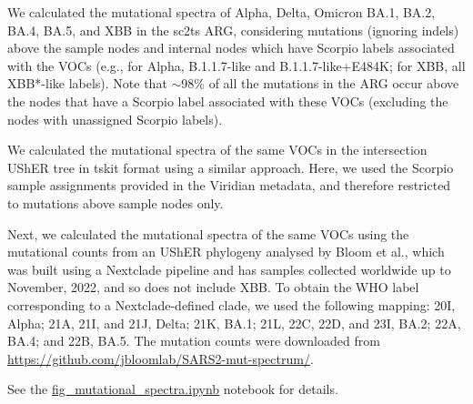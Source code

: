 \documentclass[12pt]{article}
\begin{document}
We calculated the mutational spectra of Alpha, Delta, Omicron BA.1, BA.2, BA.4, BA.5, and XBB
in the sc2ts ARG, considering mutations (ignoring indels) above the sample
nodes and internal nodes
which have Scorpio labels associated with the VOCs
(e.g., for Alpha, B.1.1.7-like and B.1.1.7-like+E484K;
for XBB, all XBB*-like labels).
Note that $\sim$98\% of all the mutations in the ARG occur
above the nodes that have a Scorpio label associated with these VOCs
(excluding the nodes with unassigned Scorpio labels).

We calculated the mutational spectra of the same VOCs
in the intersection UShER tree in tskit format using a similar approach.
Here, we used the Scorpio sample assignments provided in the Viridian metadata,
and therefore restricted to mutations above sample nodes only.

Next, we calculated the mutational spectra of the same VOCs
using the mutational counts from an UShER phylogeny
analysed by Bloom et al.\cite{Bloom2023},
which was built using a Nextclade pipeline and
has samples collected worldwide up to November, 2022,
and so does not include XBB.
To obtain the WHO label corresponding to a Nextclade-defined clade, we used the following mapping:
20I, Alpha; 21A, 21I, and 21J, Delta; 21K, BA.1; 21L, 22C, 22D, and 23I, BA.2; 22A, BA.4; and 22B, BA.5.
The mutation counts were downloaded from
\url{https://github.com/jbloomlab/SARS2-mut-spectrum/}.

See the
\href{https://github.com/jeromekelleher/sc2ts-paper/blob/main/notebooks/fig\_mutational\_spectra.ipynb}{fig\_mutational\_spectra.ipynb}
notebook for details.
\end{document}
